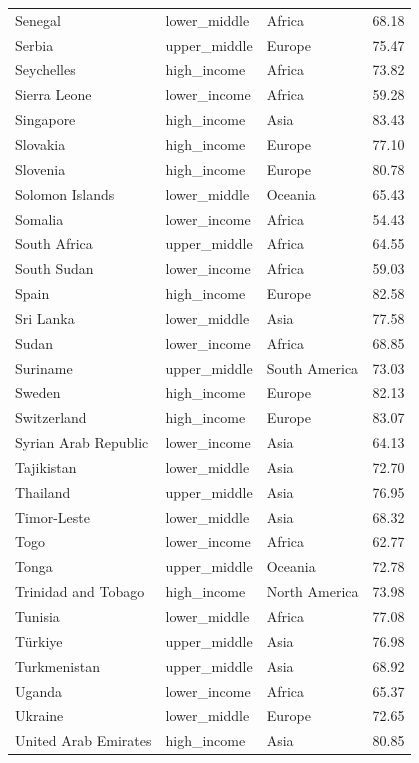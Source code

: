 \documentclass[
  letterpaper,
  DIV=11,
  numbers=noendperiod]{scrartcl}
\begin{document}
\begin{longtable}[t]{llll}
Senegal & lower\_middle & Africa & 68.18\\
Serbia & upper\_middle & Europe & 75.47\\
\addlinespace
Seychelles & high\_income & Africa & 73.82\\
Sierra Leone & lower\_income & Africa & 59.28\\
Singapore & high\_income & Asia & 83.43\\
Slovakia & high\_income & Europe & 77.10\\
Slovenia & high\_income & Europe & 80.78\\
\addlinespace
Solomon Islands & lower\_middle & Oceania & 65.43\\
Somalia & lower\_income & Africa & 54.43\\
South Africa & upper\_middle & Africa & 64.55\\
South Sudan & lower\_income & Africa & 59.03\\
Spain & high\_income & Europe & 82.58\\
\addlinespace
Sri Lanka & lower\_middle & Asia & 77.58\\
Sudan & lower\_income & Africa & 68.85\\
Suriname & upper\_middle & South America & 73.03\\
Sweden & high\_income & Europe & 82.13\\
Switzerland & high\_income & Europe & 83.07\\
\addlinespace
Syrian Arab Republic & lower\_income & Asia & 64.13\\
Tajikistan & lower\_middle & Asia & 72.70\\
Thailand & upper\_middle & Asia & 76.95\\
Timor-Leste & lower\_middle & Asia & 68.32\\
Togo & lower\_income & Africa & 62.77\\
\addlinespace
Tonga & upper\_middle & Oceania & 72.78\\
Trinidad and Tobago & high\_income & North America & 73.98\\
Tunisia & lower\_middle & Africa & 77.08\\
Türkiye & upper\_middle & Asia & 76.98\\
Turkmenistan & upper\_middle & Asia & 68.92\\
\addlinespace
Uganda & lower\_income & Africa & 65.37\\
Ukraine & lower\_middle & Europe & 72.65\\
United Arab Emirates & high\_income & Asia & 80.85\\

\end{longtable}
\end{document}
